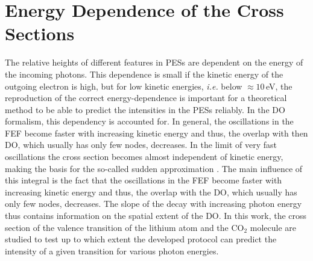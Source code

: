 \section{Energy Dependence of the Cross Sections}
\label{sec:cs}
The relative heights of different features in PESs are dependent on the energy of the incoming photons.
This dependence is small if the kinetic energy of the outgoing electron is high, but for low kinetic energies, \textit{i.e.} below $\approx 10\,$eV, the reproduction of the correct energy-dependence is important for a theoretical method to be able to predict the intensities in the PESs reliably.
In the DO formalism, this dependency is accounted for.
In general, the oscillations in the FEF become faster with increasing kinetic energy and thus, the overlap with then DO, which usually has only few nodes, decreases.
In the limit of very fast oscillations the cross section becomes almost independent of kinetic energy, making the basis for the so-called sudden approximation \cite{saAberg}.
The main influence of this integral is the fact that the oscillations in the FEF become faster with increasing kinetic energy and thus, the overlap with the DO, which usually has only few nodes, decreases.
The slope of the decay with increasing photon energy thus contains information on the spatial extent of the DO.
In this work, the cross section of the valence transition of the lithium atom and the CO$_2$ molecule are studied to test up to which extent the developed protocol can predict the intensity of a given transition for various photon energies.

